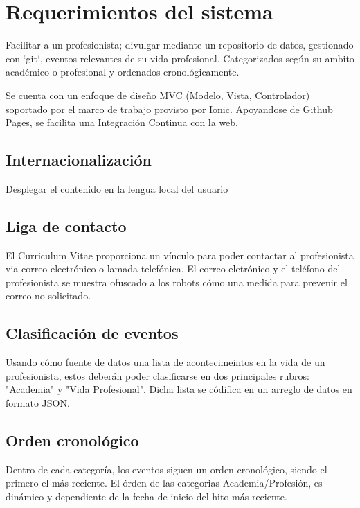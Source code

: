 \section{Requerimientos del sistema}
  Facilitar a un profesionista; divulgar mediante un repositorio de datos, gestionado con `git`, eventos relevantes de su vida profesional. Categorizados según su ambito académico o profesional y ordenados cronológicamente.

  Se cuenta con un enfoque de diseño MVC (Modelo, Vista, Controlador) soportado por el marco de trabajo provisto por Ionic. Apoyandose de Github Pages, se facilita una Integración Continua con la web.

\subsection{Internacionalización}
  Desplegar el contenido en la lengua local del usuario

\subsection{Liga de contacto}
  El Curriculum Vitae proporciona un vínculo para poder contactar al profesionista via correo electrónico o lamada telefónica. El correo eletrónico y el teléfono del profesionista se muestra ofuscado a los robots cómo una medida para prevenir el correo no solicitado.

\subsection{Clasificación de eventos}
  Usando cómo fuente de datos una lista de acontecimeintos en la vida de un profesionista, estos deberán poder clasificarse  en dos principales rubros: "Academia" y "Vida Profesional". Dicha lista se códifica en un arreglo de datos en formato JSON.

\subsection{Orden cronológico}
  Dentro de cada categoría, los eventos siguen un orden cronológico, siendo el primero el más reciente. El órden de las categorias Academia/Profesión, es dinámico y dependiente de la fecha de inicio del hito más reciente.
